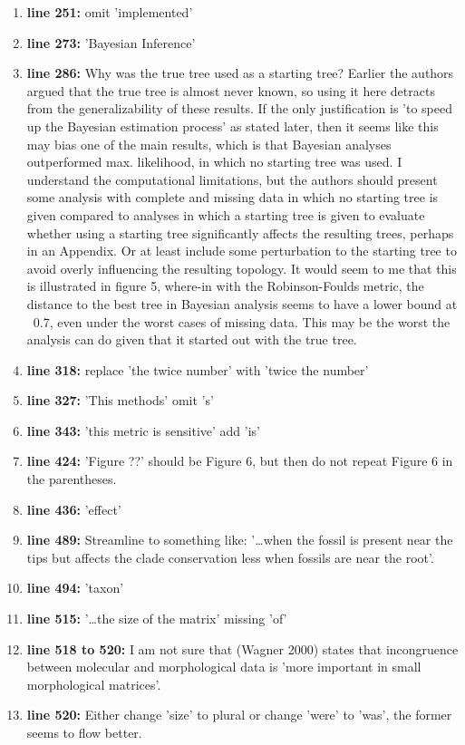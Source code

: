 \documentclass[12pt,letterpaper]{article}
\begin{document}
\begin{enumerate}
\item{\textbf{line 251:}} omit 'implemented'
\item{\textbf{line 273:}} 'Bayesian Inference'
\item{\textbf{line 286:}} Why was the true tree used as a starting tree? Earlier the authors argued that the true tree is almost never known, so using it here detracts from the generalizability of these results. If the only justification is 'to speed up the Bayesian estimation process' as stated later, then it seems like this may bias one of the main results, which is that Bayesian analyses outperformed max. likelihood, in which no starting tree was used. I understand the computational limitations, but the authors should present some analysis with complete and missing data in which no starting tree is given compared to analyses in which a starting tree is given to evaluate whether using a starting tree significantly affects the resulting trees, perhaps in an Appendix. Or at least include some perturbation to the starting tree to avoid overly influencing the resulting topology. It would seem to me that this is illustrated in figure 5, where-in with the Robinson-Foulds metric, the distance to the best tree in Bayesian analysis seems to have a lower bound at ~0.7, even under the worst cases of missing data. This may be the worst the analysis can do given that it started out with the true tree. 
\item{\textbf{line 318:}} replace 'the twice number' with 'twice the number'
\item{\textbf{line 327:}} 'This methods' omit 's'
\item{\textbf{line 343:}} 'this metric is sensitive' add 'is'
\item{\textbf{line 424:}} 'Figure ??' should be Figure 6, but then do not repeat Figure 6 in the parentheses. 
\item{\textbf{line 436:}} 'effect'
\item{\textbf{line 489:}} Streamline to something like: '…when the fossil is present near the tips but affects the clade conservation less when fossils are near the root'. 
\item{\textbf{line 494:}} 'taxon'
\item{\textbf{line 515:}} '…the size of the matrix' missing 'of'
\item{\textbf{line 518 to 520:}} I am not sure that (Wagner 2000) states that incongruence between molecular and morphological data is 'more important in small morphological matrices'. 
\item{\textbf{line 520:}} Either change 'size' to plural or change 'were' to 'was', the former seems to flow better. 

\end{enumerate}
\end{document}
